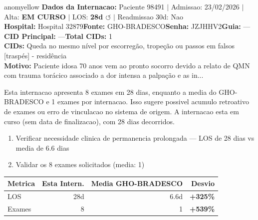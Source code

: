 \documentclass[a4paper,10pt]{article}
\begin{document}
\begin{anomalycard}[Internacao 118725 | GHO-BRADESCO | MODERADO (z=2.83)]{anomyellow}
\textbf{Dados da Internacao:} Paciente 98491 $\mid$ Admissao: 23/02/2026 $\mid$ Alta: \textcolor{anomorange}{\textbf{EM CURSO}} $\mid$ LOS: \textbf{28d \textcolor{anomorange}{$\circlearrowleft$}} $\mid$ Readmissao 30d: Nao\\
\textbf{Hospital:} Hospital 32879\quad\textbf{Fonte:} GHO-BRADESCO\quad\textbf{Senha:} JZJHHV2\quad\textbf{Guia:} ---\\
\textbf{CID Principal:} {\small ---}\quad\textbf{Total CIDs:} 1\\

\textbf{CIDs:} {\scriptsize Queda no mesmo nível por escorregão, tropeção ou passos em falsos [traspés] - residência}\\

\textbf{Motivo:} {\scriptsize Paciente idosa 70 anos vem ao pronto socorro devido a relato de QMN com trauma torácico associado a dor intensa a palpação e as in...}\\

\vspace{2pt}\begin{tcolorbox}[colback=severityred!20,colframe=anomyellow,title={\textbf{Interpretacao de Negocio}},fonttitle=\bfseries\small,left=4pt,right=4pt,top=3pt,bottom=3pt]
{\small Esta internacao apresenta 8 exames em 28 dias, enquanto a media do GHO-BRADESCO e 1 exames por internacao. Isso sugere possivel acumulo retroativo de exames ou erro de vinculacao no sistema de origem. A internacao esta em curso (sem data de finalizacao), com 28 dias decorridos.}
\end{tcolorbox}
\begin{tcolorbox}[colback=severityyellow!30,colframe=anomorange,title={\textbf{Recomendacoes Especificas}},fonttitle=\bfseries\small,left=4pt,right=4pt,top=3pt,bottom=3pt]
\begin{enumerate}[nosep,leftmargin=16pt]
\item {\small Verificar necessidade clinica de permanencia prolongada --- LOS de 28 dias vs media de 6.6 dias}
\item {\small Validar os 8 exames solicitados (media: 1)}
\end{enumerate}
\end{tcolorbox}
\begin{center}\begin{tabular}{l r r r}\toprule\textbf{Metrica} & \textbf{Esta Intern.} & \textbf{Media GHO-BRADESCO} & \textbf{Desvio} \\\midrule
LOS & 28d & 6.6d & \textcolor{anomred}{\textbf{+325\%}} \\
Exames & 8 & 1 & \textcolor{anomred}{\textbf{+539\%}} \\
\bottomrule\end{tabular}\end{center}


\end{anomalycard}
\end{document}
